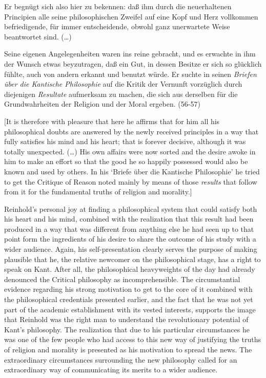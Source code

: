 Er begn\"{u}gt sich also hier zu bekennen: da\ss{} ihm durch die neuerhaltenen Principien alle seine philosophischen Zweifel auf eine Kopf und Herz vollkommen befriedigende, f\"{u}r immer entscheidende, obwohl ganz unerwartete Weise beantwortet sind. (\ldots )

Seine eigenen Angelegenheiten waren ins reine gebracht, und es erwachte in ihm der Wunsch etwas beyzutragen, da\ss{} ein Gut, in dessen Besitze er sich so gl\"{u}cklich f\"{u}hlte, auch von andern erkannt und benutzt w\"{u}rde. Er suchte in seinen \textit{Briefen \"{u}ber die Kantische Philosophie }auf die Kritik der Vernunft vorz\"{u}glich durch diejenigen \textit{Resultate }aufmerksam zu machen, die sich aus derselben f\"{u}r die Grundwahrheiten der Religion und der Moral ergeben. (56{-}57)

[It is therefore with pleasure that here he affirms that for him all his philosophical doubts are answered by the newly received principles in a way that fully satisfies his mind and his heart; that is forever decisive, although it was totally unexpected. (\ldots ) His own affairs were now sorted and the desire awoke in him to make an effort so that the good he so happily possessed would also be known and used by others. In his `Briefe \"{u}ber die Kantische Philosophie' he tried to get the Critique of Reason noted mainly by means of those \textit{results} that follow from it for the fundamental truths of religion and morality.]

Reinhold's personal joy at finding a philosophical system that could satisfy both his heart and his mind, combined with the realization that this result had been produced in a way that was different from anything else he had seen up to that point form the ingredients of his desire to share the outcome of his study with a wider audience. Again, his self{-}presentation clearly serves the purpose of making plausible that he, the relative newcomer on the philosophical stage, has a right to speak on Kant. After all, the philosophical heavyweights of the day had already denounced the Critical philosophy as incomprehensible. The circumstantial evidence regarding his strong motivation to get to the core of it combined with the philosophical credentials presented earlier, and the fact that he was not yet part of the academic establishment with its vested interests, supports the image that Reinhold was the right man to understand the revolutionary potential of Kant's philosophy. The realization that due to his particular circumstances he was one of the few people who had access to this new way of justifying the truths of religion and morality is presented as his motivation to spread the news. The extraordinary circumstances surrounding the new philosophy called for an extraordinary way of communicating its merits to a wider audience.

